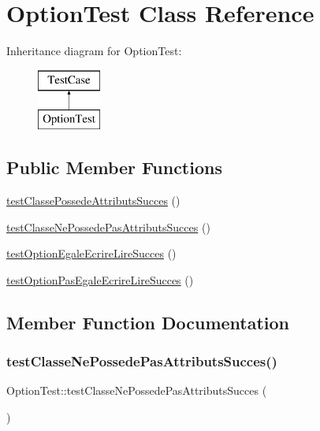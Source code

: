 \hypertarget{class_option_test}{}\section{Option\+Test Class Reference}
\label{class_option_test}
Inheritance diagram for Option\+Test\+:\begin{figure}[H]
\begin{center}
\leavevmode
\includegraphics[height=2.000000cm]{class_option_test}
\end{center}
\end{figure}
\subsection*{Public Member Functions}
\begin{DoxyCompactItemize}
\item 
\hyperlink{class_option_test_ac2cc6581a51f9a7f925524db61c93408}{test\+Classe\+Possede\+Attributs\+Succes} ()
\item 
\hyperlink{class_option_test_a677aad9534a5c13f47e03e408f73aadb}{test\+Classe\+Ne\+Possede\+Pas\+Attributs\+Succes} ()
\item 
\hyperlink{class_option_test_a34b6d762db2e2c0020105b8d028ce80d}{test\+Option\+Egale\+Ecrire\+Lire\+Succes} ()
\item 
\hyperlink{class_option_test_a71e2ea342e30000945bd8433a14def4a}{test\+Option\+Pas\+Egale\+Ecrire\+Lire\+Succes} ()
\end{DoxyCompactItemize}


\subsection{Member Function Documentation}
\mbox{\label{class_option_test_a677aad9534a5c13f47e03e408f73aadb}} 
\subsubsection{\texorpdfstring{test\+Classe\+Ne\+Possede\+Pas\+Attributs\+Succes()}{testClasseNePossedePasAttributsSucces()}}
{\footnotesize\ttfamily Option\+Test\+::test\+Classe\+Ne\+Possede\+Pas\+Attributs\+Succes (\begin{DoxyParamCaption}{ }\end{DoxyParamCaption})}

